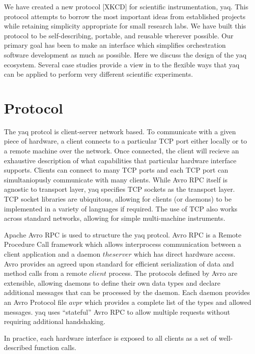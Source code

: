 \documentclass{article}
\begin{document}
We have created a new protocol [XKCD] for scientific instrumentation, yaq.
This protocol attempts to borrow the most important ideas from established projects while retaining simplicity appropriate for small research labs.
We have built this protocol to be self-describing, portable, and reusable wherever possible.
Our primary goal has been to make an interface which simplifies orchestration software development as much as possible.
Here we discuss the design of the yaq ecosystem.
Several case studies provide a view in to the flexible ways that yaq can be applied to perform very different scientific experiments.

\section{Protocol}

The yaq protcol is client-server network based.
To communicate with a given piece of hardware, a client connects to a particular TCP port either locally or to a remote machine over the network.
Once connected, the client will recieve an exhaustive description of what capabilities that particular hardware interface supports.
Clients can connect to many TCP ports and each TCP port can simultaniopusly communicate with many clients.
While Avro RPC itself is agnostic to transport layer, yaq specifies TCP sockets as the transport layer.
TCP socket libraries are ubiquitous, allowing for clients (or daemons) to be implemented in a variety of languages if required.
The use of TCP also works across standard networks, allowing for simple multi-machine instruments.

Apache Avro RPC \cite{AvroSpecification} is used to structure the yaq protcol.
Avro RPC is a Remote Procedure Call framework which allows interprocess communication between a client application and a daemon \(the server\) which has direct hardware access.
Avro provides an agreed upon standard for efficient serialization of data and method calls from a remote \(client\) process.
The protocols defined by Avro are extensible, allowing daemons to define their own data types and declare additional messages that can be processed by the daemon.
Each daemon provides an Avro Protocol file \(avpr\) which provides a complete list of the types and allowed messages.
yaq uses ``stateful'' Avro RPC to allow multiple requests without requiring additional handshaking.

In practice, each hardware interface is exposed to all clients as a set of well-described function calls.
\end{document}
